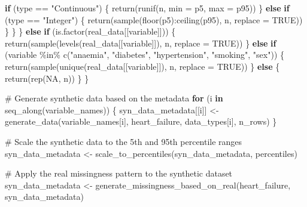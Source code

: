 \documentclass[
  letterpaper,
  DIV=11,
  numbers=noendperiod]{scrartcl}
\newenvironment{Shaded}{\begin{snugshade}}{\end{snugshade}}
\newcommand{\AttributeTok}[1]{\textcolor[rgb]{0.40,0.45,0.13}{#1}}
\newcommand{\CommentTok}[1]{\textcolor[rgb]{0.37,0.37,0.37}{#1}}
\newcommand{\ConstantTok}[1]{\textcolor[rgb]{0.56,0.35,0.01}{#1}}
\newcommand{\ControlFlowTok}[1]{\textcolor[rgb]{0.00,0.23,0.31}{\textbf{#1}}}
\newcommand{\FunctionTok}[1]{\textcolor[rgb]{0.28,0.35,0.67}{#1}}
\newcommand{\NormalTok}[1]{\textcolor[rgb]{0.00,0.23,0.31}{#1}}
\newcommand{\OtherTok}[1]{\textcolor[rgb]{0.00,0.23,0.31}{#1}}
\newcommand{\SpecialCharTok}[1]{\textcolor[rgb]{0.37,0.37,0.37}{#1}}
\newcommand{\StringTok}[1]{\textcolor[rgb]{0.13,0.47,0.30}{#1}}
\begin{document}
\begin{Shaded}
\begin{Highlighting}[]
      \ControlFlowTok{if}\NormalTok{ (type }\SpecialCharTok{==} \StringTok{"Continuous"}\NormalTok{) \{}
        \FunctionTok{return}\NormalTok{(}\FunctionTok{runif}\NormalTok{(n, }\AttributeTok{min =}\NormalTok{ p5, }\AttributeTok{max =}\NormalTok{ p95))}
\NormalTok{      \} }\ControlFlowTok{else} \ControlFlowTok{if}\NormalTok{ (type }\SpecialCharTok{==} \StringTok{"Integer"}\NormalTok{) \{}
        \FunctionTok{return}\NormalTok{(}\FunctionTok{sample}\NormalTok{(}\FunctionTok{floor}\NormalTok{(p5)}\SpecialCharTok{:}\FunctionTok{ceiling}\NormalTok{(p95), n, }\AttributeTok{replace =} \ConstantTok{TRUE}\NormalTok{))}
\NormalTok{      \}}
\NormalTok{    \}}
\NormalTok{  \} }\ControlFlowTok{else} \ControlFlowTok{if}\NormalTok{ (}\FunctionTok{is.factor}\NormalTok{(real\_data[[variable]])) \{}
    \FunctionTok{return}\NormalTok{(}\FunctionTok{sample}\NormalTok{(}\FunctionTok{levels}\NormalTok{(real\_data[[variable]]), n, }\AttributeTok{replace =} \ConstantTok{TRUE}\NormalTok{))}
\NormalTok{  \} }\ControlFlowTok{else} \ControlFlowTok{if}\NormalTok{ (variable }\SpecialCharTok{\%in\%} \FunctionTok{c}\NormalTok{(}\StringTok{"anaemia"}\NormalTok{, }\StringTok{"diabetes"}\NormalTok{, }\StringTok{"hypertension"}\NormalTok{, }\StringTok{"smoking"}\NormalTok{, }\StringTok{"sex"}\NormalTok{)) \{}
    \FunctionTok{return}\NormalTok{(}\FunctionTok{sample}\NormalTok{(}\FunctionTok{unique}\NormalTok{(real\_data[[variable]]), n, }\AttributeTok{replace =} \ConstantTok{TRUE}\NormalTok{))}
\NormalTok{  \} }\ControlFlowTok{else}\NormalTok{ \{}
    \FunctionTok{return}\NormalTok{(}\FunctionTok{rep}\NormalTok{(}\ConstantTok{NA}\NormalTok{, n))}
\NormalTok{  \}}
\NormalTok{\}}

\CommentTok{\# Generate synthetic data based on the metadata}
\ControlFlowTok{for}\NormalTok{ (i }\ControlFlowTok{in} \FunctionTok{seq\_along}\NormalTok{(variable\_names)) \{}
\NormalTok{  syn\_data\_metadata[[i]] }\OtherTok{\textless{}{-}} \FunctionTok{generate\_data}\NormalTok{(variable\_names[i], heart\_failure, data\_types[i], n\_rows)}
\NormalTok{\}}

\CommentTok{\# Scale the synthetic data to the 5th and 95th percentile ranges}
\NormalTok{syn\_data\_metadata }\OtherTok{\textless{}{-}} \FunctionTok{scale\_to\_percentiles}\NormalTok{(syn\_data\_metadata, percentiles)}

\CommentTok{\# Apply the real missingness pattern to the synthetic dataset}
\NormalTok{syn\_data\_metadata }\OtherTok{\textless{}{-}} \FunctionTok{generate\_missingness\_based\_on\_real}\NormalTok{(heart\_failure, syn\_data\_metadata)}


\end{Highlighting}
\end{Shaded}
\end{document}
